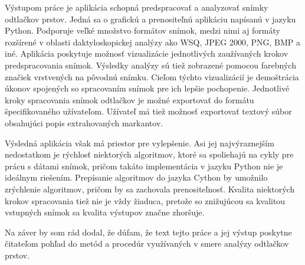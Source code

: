   Výstupom práce je aplikácia schopná predspracovať a analyzovať snímky odtlačkov prstov. Jedná sa o grafickú a prenositeľnú aplikáciu napísanú v jazyku
  Python. Podporuje veľké množstvo formátov snímok, medzi nimi aj formáty rozšírené v oblasti daktyloskopickej analýzy ako WSQ, JPEG 2000, PNG, BMP a iné.
  Aplikácia poskytuje možnosť vizualizácie jednotlivých zaužívaných krokov predspracovania snímok. Výsledky analýzy sú tiež zobrazené pomocou farebných
  značiek vrstvených na pôvodnú snímku. Cieľom týchto vizualizácií je demoštrácia úkonov spojených so spracovaním snímok pre ich lepšie pochopenie.
  Jednotlivé kroky spracovania snímok odtlačkov je možné exportovať do formátu špecifikovaného užívateľom. Užívateľ má tiež možnosť exportovať textový súbor
  obsahujúci popis extrahovaných markantov.

  Výsledná aplikácia však má priestor pre vylepšenie. Asi jej najvýraznejším nedostatkom je rýchlosť niektorých algoritmov, ktoré sa spoliehajú na
  cykly pre prácu s dátami snímok, pričom takáto implementácia v jazyku Python nie je ideálnym riešením. Prepísanie algoritmov do jazyka Cython by umožnilo
  zrýchlenie algoritmov, pričom by sa zachovala prenositeľnosť. Kvalita niektorých krokov spracovania tiež nie je vždy žiaduca, pretože so znižujúcou sa kvalitou
  vstupných snímok sa kvalita výstupov značne zhoršuje.

  Na záver by som rád dodal, že dúfam, že text tejto práce a jej výstup poskytne čitateľom pohľad do metód a procedúr využívaných v smere analýzy odtlačkov
  prstov.

